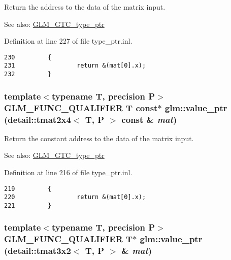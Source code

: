 Return the address to the data of the matrix input. \begin{Desc}
\item[See also:]\hyperlink{group__gtc__type__ptr}{GLM\_\-GTC\_\-type\_\-ptr} \end{Desc}


Definition at line 227 of file type\_\-ptr.inl.

\begin{Code}\begin{verbatim}230         {
231                 return &(mat[0].x);
232         }
\end{verbatim}
\end{Code}


\hypertarget{group__gtc__type__ptr_g9efd0cc6b3e12ec8953d9a96e8b750b0}{
\subsubsection[value\_\-ptr]{\setlength{\rightskip}{0pt plus 5cm}template$<$typename T, precision P$>$ GLM\_\-FUNC\_\-QUALIFIER T const$\ast$ glm::value\_\-ptr (detail::tmat2x4$<$ T, P $>$ const \& {\em mat})}}
\label{group__gtc__type__ptr_g9efd0cc6b3e12ec8953d9a96e8b750b0}


Return the constant address to the data of the matrix input. \begin{Desc}
\item[See also:]\hyperlink{group__gtc__type__ptr}{GLM\_\-GTC\_\-type\_\-ptr} \end{Desc}


Definition at line 216 of file type\_\-ptr.inl.

\begin{Code}\begin{verbatim}219         {
220                 return &(mat[0].x);
221         }
\end{verbatim}
\end{Code}


\hypertarget{group__gtc__type__ptr_gd4e46790704d514a05d86164af942d72}{
\subsubsection[value\_\-ptr]{\setlength{\rightskip}{0pt plus 5cm}template$<$typename T, precision P$>$ GLM\_\-FUNC\_\-QUALIFIER T$\ast$ glm::value\_\-ptr (detail::tmat3x2$<$ T, P $>$ \& {\em mat})}}
\label{group__gtc__type__ptr_gd4e46790704d514a05d86164af942d72}


